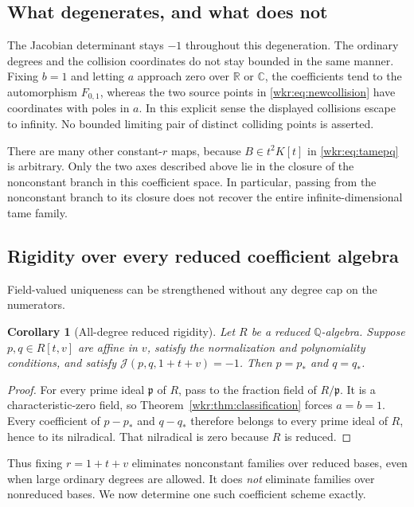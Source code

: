 \documentclass[11pt,a4paper]{article}
\numberwithin{equation}{section}
\newtheorem{corollary}[theorem]{Corollary}
\theoremstyle{definition}
\theoremstyle{remark}
\newcommand{\Q}{\mathbb{Q}}
\newcommand{\J}{\mathcal{J}}
\begin{document}
\subsection{What degenerates, and what does not}

The Jacobian determinant stays $-1$ throughout this degeneration. The
ordinary degrees and the collision coordinates do not stay bounded in the
same manner. Fixing $b=1$ and letting $a$ approach zero over $\mathbb R$ or
$\mathbb C$, the coefficients tend to the automorphism $F_{0,1}$, whereas
the two source points in \eqref{wkr:eq:newcollision} have coordinates with
poles in $a$. In this explicit sense the displayed collisions escape to
infinity. No bounded limiting pair of distinct colliding points is asserted.

There are many other constant-$r$ maps, because $B\in t^2K[t]$ in
\eqref{wkr:eq:tamepq} is arbitrary. Only the two axes described above lie in the
closure of the nonconstant branch in this coefficient space. In particular,
passing from the nonconstant branch to its closure does not recover the
entire infinite-dimensional tame family.

\subsection{Rigidity over every reduced coefficient algebra}

Field-valued uniqueness can be strengthened without any degree cap on the
numerators.

\begin{corollary}[All-degree reduced rigidity]\label{wkr:cor:reduced}
Let $R$ be a reduced $\Q$-algebra. Suppose $p,q\in R[t,v]$ are affine in
$v$, satisfy the normalization and polynomiality conditions, and satisfy
$\J(p,q,1+t+v)=-1$. Then $p=p_*$ and $q=q_*$.
\end{corollary}
\begin{proof}
For every prime ideal $\mathfrak p$ of $R$, pass to the fraction field of
$R/\mathfrak p$. It is a characteristic-zero field, so
Theorem~\ref{wkr:thm:classification} forces $a=b=1$. Every coefficient of
$p-p_*$ and $q-q_*$ therefore belongs to every prime ideal of $R$, hence to
its nilradical. That nilradical is zero because $R$ is reduced.
\end{proof}

Thus fixing $r=1+t+v$ eliminates nonconstant families over reduced bases,
even when large ordinary degrees are allowed. It does \emph{not} eliminate
families over nonreduced bases. We now determine one such coefficient
scheme exactly.
\end{document}
